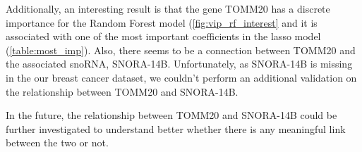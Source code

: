 \documentclass[journal]{IEEEtran}
\begin{document}
Additionally, an interesting result is that the gene TOMM20 has a discrete importance for the Random Forest model (\cref{fig:vip_rf_interest} and it is associated with one of the most important coefficients in the lasso model (\cref{table:most_imp}). Also, there seems to be a connection between TOMM20 and the associated snoRNA, SNORA-14B. Unfortunately, as SNORA-14B is missing in the our breast cancer dataset, we couldn't perform an additional validation on the relationship between TOMM20 and SNORA-14B.

In the future, the relationship between TOMM20 and SNORA-14B could be further investigated to understand better whether there is any meaningful link between the two or not.






\twocolumn



\appendices
\end{document}
